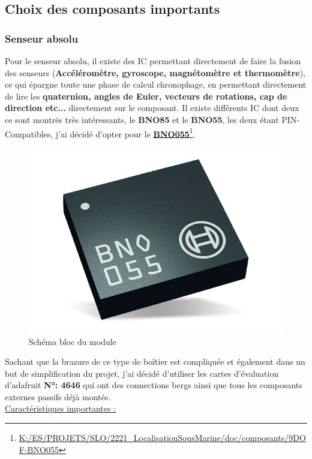 \clearpage

\subsection{Choix des composants importants} \label{ssec:num02}
{

\subsubsection{Senseur absolu}
{
    Pour le senseur absolu, il existe des IC permettant directement de faire la fusion des senseurs (\textbf{Accéléromètre, gyroscope, magnétomètre et thermomètre}), ce qui épargne toute une phase de calcul chronophage, en permettant directement de lire les \textbf{quaternion, angles de Euler, vecteurs de rotations, cap de direction etc...} directement sur le composant. Il existe différents IC dont deux ce sont montrés très intéressants, le \textbf{BNO85} et le \textbf{BNO55}, les deux étant PIN-Compatibles, j'ai décidé d'opter pour le \textbf{\underline{BNO055}}\footnote{\href{K:/ES/PROJETS/SLO/2221\_LocalisationSousMarine/doc/composants/9DOF-BNO055}{K:/ES/PROJETS/SLO/2221\_LocalisationSousMarine/doc/composants/9DOF-BNO055}}.
    
    \begin{figure}[h]
    \centering
    \includegraphics[width=.4\textwidth]{Figures/BNO055-Illustration}
    \caption{Schéma bloc du module}
    \label{fig:SchemaBloc}
    \end{figure}
    
    Sachant que la brazure de ce type de boîtier est compliquée et également dans un but de simplification du projet, j'ai décidé d'utiliser les cartes d'évaluation d'adafruit \textbf{N°: 4646} qui ont des connections bergs ainsi que tous les composants externes passifs déjà montés. \\
    
    \underline{Caractéristiques importantes :} \\
    
}}
